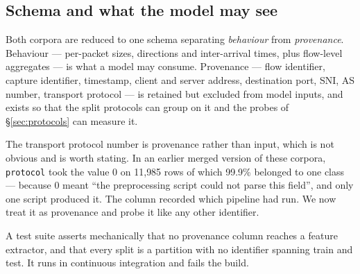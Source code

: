\subsection{Schema and what the model may see}

Both corpora are reduced to one schema separating \emph{behaviour} from
\emph{provenance}. Behaviour --- per-packet sizes, directions and inter-arrival
times, plus flow-level aggregates --- is what a model may consume. Provenance
--- flow identifier, capture identifier, timestamp, client and server address,
destination port, SNI, AS number, transport protocol --- is retained but
excluded from model inputs, and exists so that the split protocols can group on
it and the probes of \S\ref{sec:protocols} can measure it.

The transport protocol number is provenance rather than input, which is not
obvious and is worth stating. In an earlier merged version of these corpora,
\texttt{protocol} took the value 0 on 11{,}985 rows of which 99.9\% belonged to
one class --- because 0 meant ``the preprocessing script could not parse this
field'', and only one script produced it. The column recorded which pipeline
had run. We now treat it as provenance and probe it like any other identifier.

A test suite asserts mechanically that no provenance column reaches a feature
extractor, and that every split is a partition with no identifier spanning
train and test. It runs in continuous integration and fails the build.
